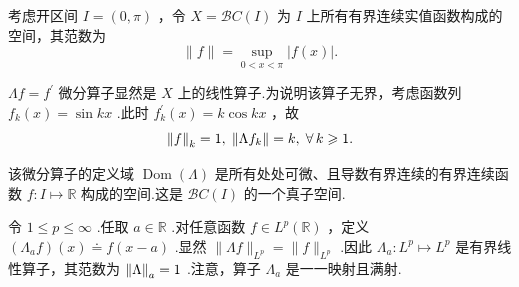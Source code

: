 \begin{instance}[微分算子]
    考虑开区间 $I = ( 0,\pi )$ ，令 $X = \mathcal{B}C\left( I\right)$ 为 $I$ 上所有有界连续实值函数构成的空间，其范数为
\[
\| f\|  = \mathop{\sup }\limits_{{0 < x < \pi }}\left| {f\left( x\right) }\right| .
\]

${\Lambda f} = {f}^{\prime }$ 微分算子显然是 $X$ 上的线性算子.为说明该算子无界，考虑函数列 ${f}_{k}\left( x\right)  = \sin {kx}$ .此时 ${f}_{k}^{\prime }\left( x\right)  = k\cos {kx}$ ，故
\[
\norm{f}_{k} = 1,\;\norm{\Lambda {f}_{k}} = k,\;\forall\, k \geqslant  1.
\]

该微分算子的定义域 $\operatorname{Dom}\left( \Lambda \right)$ 是所有处处可微、且导数有界连续的有界连续函数 $f : I \mapsto  \mathbb{R}$ 构成的空间.这是 $\mathcal{B}C\left( I\right)$ 的一个真子空间.
\end{instance}

\begin{instance}
    令 $1 \leq  p \leq  \infty$ .任取 $a \in  \mathbb{R}$ .对任意函数 $f \in  {L}^{p}\left( \mathbb{R}\right)$ ，定义 $\left( {{\Lambda }_{a}f}\right) \left( x\right)  \doteq  f\left( {x - a}\right)$ .显然 $\| {\Lambda f}{\| }_{{L}^{p}} = \| f{\| }_{{L}^{p}}$ .因此 ${\Lambda }_{a} : {L}^{p} \mapsto  {L}^{p}$ 是有界线性算子，其范数为 $\norm{\Lambda }_{a} = 1$ .注意，算子 ${\Lambda }_{a}$ 是一一映射且满射.
\end{instance}

